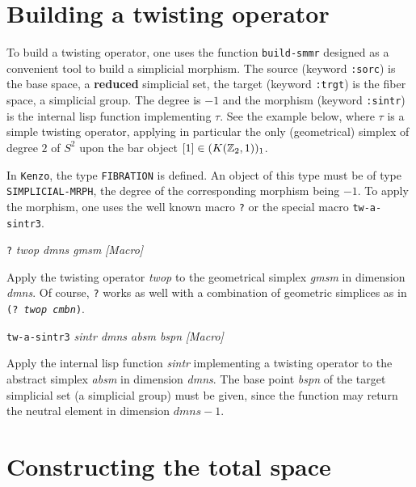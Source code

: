 \section {Building a twisting operator}

To build a twisting operator, one uses the function {\tt build-smmr} designed as a convenient tool
to build a simplicial morphism. The source (keyword {\tt :sorc}) is the base space, a {\bf reduced} simplicial
set, the target (keyword {\tt :trgt}) is the fiber space, a simplicial group. The degree is $-1$ and
the morphism (keyword {\tt :sintr}) is the internal lisp function implementing $\tau$. See the example
below, where $\tau$ is a simple twisting operator, applying in particular the only (geometrical) simplex
of degree $2$  of $S^2$ upon the bar object  $[1] \in (K({{\Bbb Z}}_2,1))_1$. \par
In {\tt Kenzo}, the type {\tt FIBRATION} is defined. An object of this type must be of type
{\tt SIMPLICIAL-MRPH}, the degree of the corresponding morphism  being  $-1$. To apply the morphism, 
one uses the well known macro {\tt ?} or the special macro {\tt tw-a-sintr3}.
\vskip 0.30cm
{\parindent=0mm
{\leftskip=5mm
{\tt ?} {\em twop dmns gmsm}  \hfill {\em [Macro]} \par}
{\leftskip=15mm
Apply the twisting operator {\em twop} to the geometrical simplex {\em gmsm} in dimension
{\em dmns}. Of course, {\tt ?} works as well with a combination of geometric simplices
as in  {\tt (? {\em twop cmbn})}. \par}
{\leftskip=5mm
{\tt tw-a-sintr3} {\em sintr dmns absm bspn} \hfill {\em [Macro]} \par}
{\leftskip=15mm
Apply the internal lisp function {\em sintr} implementing a twisting o\-pe\-ra\-tor to the
abstract simplex {\em absm} in dimension {\em dmns}. The base point {\em bspn} of the
target simplicial set (a simplicial group) must be given, since the function may return the neutral
element in dimension $dmns - 1$. \par}
}
\newpage

\section {Constructing the total space}

